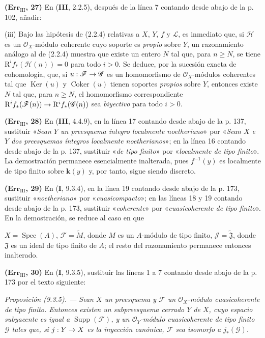 \documentclass[10pt,oneside,openany]{book}
\theoremstyle{egaenv}\newtheorem*{env}{---}
\theoremstyle{egastatement}
\theoremstyle{egadescription}
\newcommand{\oldpage}[2][]{\marginnote{\normalfont\scriptsize\textbf{#1}\,|\,#2}\ignorespaces}
\renewcommand{\geq}{\geqslant}
\renewcommand{\to}{\mathchoice{\longrightarrow}{\rightarrow}{\rightarrow}{\rightarrow}}
\begin{document}
\noindent\textbf{($\mathbf{Err}_{\mathrm{III}}$, 27)} En (\textbf{III}, 2.2.5),
después de la línea 7 contando desde abajo de la p. 102, añadir:

(iii) Bajo las hipótesis de (2.2.4) relativas a $X$, $Y$, $f$ y $\mathscr L$,
es inmediato que, si $\mathscr H$ es un $\mathscr O_X$-módulo coherente cuyo
soporte es \emph{propio} sobre $Y$, un razonamiento análogo al de (2.2.4)
muestra que existe un entero $N$ tal que, para $n\geq N$, se tiene
$\mathrm R^if_*(\mathscr H(n))=0$ para todo $i>0$. Se deduce, por la sucesión
exacta de cohomología, que, si $u:\mathscr F\to\mathscr G$ es un homomorfismo
de $\mathscr O_X$-módulos coherentes tal que $\operatorname{Ker}(u)$ y
$\operatorname{Coker}(u)$ tienen soportes \emph{propios} sobre $Y$, entonces
existe $N$ tal que, para $n\geq N$, el homomorfismo correspondiente
$\mathrm R^if_*(\mathscr F(n))\to\mathrm R^if_*(\mathscr G(n))$ sea
\emph{biyectivo} para todo $i>0$.

\noindent\textbf{($\mathbf{Err}_{\mathrm{III}}$, 28)} En (\textbf{III}, 4.4.9), en la
línea 17 contando desde abajo de la p. 137, sustituir «\emph{Sean $Y$ un
preesquema íntegro localmente noetheriano}» por «\emph{Sean $X$ e $Y$ dos
preesquemas íntegros localmente noetherianos}»; en la línea 16 contando desde
abajo de la p. 137, sustituir «\emph{de tipo finito}» por «\emph{localmente de
tipo finito}». La demostración permanece esencialmente inalterada, pues
$f^{-1}(y)$ es localmente de tipo finito sobre $\boldsymbol{k}(y)$ y, por tanto, sigue
siendo discreto.

\noindent\textbf{($\mathbf{Err}_{\mathrm{III}}$, 29)} En (\textbf I, 9.3.4), en la
línea 19 contando desde abajo de la p. 173, sustituir «\emph{noetheriano}» por
«\emph{cuasicompacto}»; en las líneas 18 y 19 contando desde abajo de la p.
173, sustituir «\emph{coherente}» por «\emph{cuasicoherente de tipo finito}».
En la demostración, se reduce al caso en que

\oldpage[III]{223}
$X=\operatorname{Spec}(A)$, $\mathscr F=\widetilde M$, donde $M$ es un
$A$-módulo de tipo finito, $\mathscr J=\widetilde{\mathfrak J}$, donde
$\mathfrak J$ es un ideal de tipo finito de $A$; el resto del razonamiento
permanece entonces inalterado.

\noindent\textbf{($\mathbf{Err}_{\mathrm{III}}$, 30)} En (\textbf I, 9.3.5),
sustituir las líneas 1 a 7 contando desde abajo de la p. 173 por el texto
siguiente:

\emph{Proposición (9.3.5). --- Sean $X$ un preesquema y $\mathscr F$ un
$\mathscr O_X$-módulo cuasicoherente de tipo finito. Entonces existen un
subpreesquema cerrado $Y$ de $X$, cuyo espacio subyacente es igual a
$\operatorname{Supp}(\mathscr F)$, y un $\mathscr O_Y$-módulo cuasicoherente de
tipo finito $\mathscr G$ tales que, si $j:Y\to X$ es la inyección canónica,
$\mathscr F$ sea isomorfo a $j_*(\mathscr G)$.}
\end{document}
